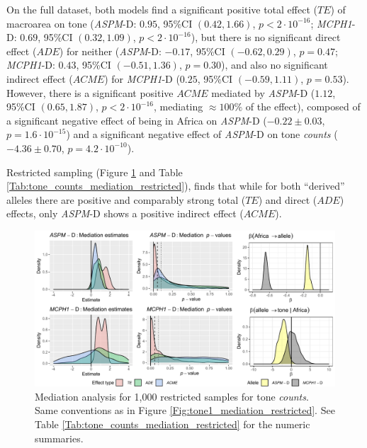 \documentclass[twoside,onecolumn]{article}
\begin{document}
On the full dataset, both models find a significant positive total effect ($TE$) of macroarea on tone (\textit{ASPM}-D: $0.95$, 95\%CI $(0.42, 1.66)$, $p < 2\cdot10^{-16}$; \textit{MCPH1}-D:  $0.69$, 95\%CI $(0.32, 1.09)$, $p < 2\cdot10^{-16}$), but there is no significant direct effect ($ADE$) for neither (\textit{ASPM}-D: $-0.17$, 95\%CI $(-0.62, 0.29)$, $p = 0.47$; \textit{MCPH1}-D:  $0.43$, 95\%CI $(-0.51, 1.36)$, $p = 0.30$), and also no significant indirect effect ($ACME$) for \textit{MCPH1}-D ($0.25$, 95\%CI $(-0.59, 1.11)$, $p = 0.53$).
However, there is a significant positive $ACME$ mediated by \textit{ASPM}-D ($1.12$, 95\%CI $(0.65, 1.87)$, $p < 2\cdot10^{-16}$, mediating $\approx 100\%$ of the effect), composed of a significant negative effect of being in Africa on \textit{ASPM}-D ($-0.22 \pm0.03$, $p = 1.6\cdot10^{-15}$) and a significant negative effect of \textit{ASPM}-D on tone \textit{counts} ($-4.36 \pm0.70$, $p = 4.2\cdot10^{-10}$).

Restricted sampling (Figure \ref{Fig:tone_counts_mediation_restricted} and Table \ref{Tab:tone_counts_mediation_restricted}), finds that while for both ``derived'' alleles there are positive and comparably strong total ($TE$) and direct ($ADE$) effects, only \textit{ASPM}-D shows a positive indirect effect ($ACME$).

\begin{figure}[h]
  \centering
  \includegraphics[width=\textwidth]{../../code/figures/tone_counts_mediation_restricted}
  \caption{Mediation analysis for 1,000 restricted samples for tone \textit{counts}. Same conventions as in Figure \ref{Fig:tone1_mediation_restricted}. See Table \ref{Tab:tone_counts_mediation_restricted} for the numeric summaries.}
  \label{Fig:tone_counts_mediation_restricted}
\end{figure}
\end{document}

